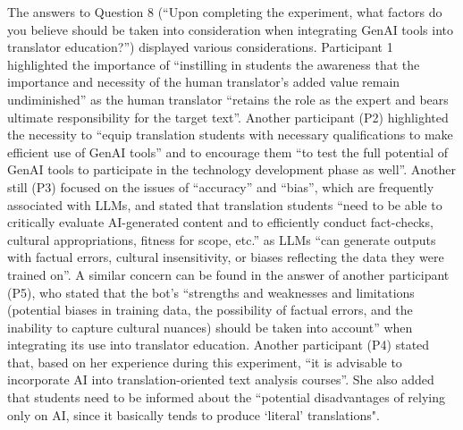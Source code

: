 \documentclass[output=paper,colorlinks,citecolor=brown]{langscibook}
\begin{document}
The answers to Question 8 (“Upon completing the experiment, what factors do you believe should be taken into consideration when integrating GenAI tools into translator education?”) displayed various considerations. Participant 1 highlighted the importance of “instilling in students the awareness that the importance and necessity of the human translator’s added value remain undiminished” as the human translator “retains the role as the expert and bears ultimate responsibility for the target text”. Another participant (P2) highlighted the necessity to “equip translation students with necessary qualifications to make efficient use of GenAI tools” and to encourage them “to test the full potential of GenAI tools to participate in the technology development phase as well”. Another still (P3) focused on the issues of “accuracy” and “bias”, which are frequently associated with LLMs, and stated that translation students “need to be able to critically evaluate AI-generated content and to efficiently conduct fact-checks, cultural appropriations, fitness for scope, etc.” as LLMs “can generate outputs with factual errors, cultural insensitivity, or biases reflecting the data they were trained on”. A similar concern can be found in the answer of another participant (P5), who stated that the bot’s “strengths and weaknesses and limitations (potential biases in training data, the possibility of factual errors, and the inability to capture cultural nuances) should be taken into account” when integrating its use into translator education. Another participant (P4) stated that, based on her experience during this experiment, “it is advisable to incorporate AI into translation-oriented text analysis courses”. She also added that students need to be informed about the “potential disadvantages of relying only on AI, since it basically tends to produce `literal' translations".
\end{document}

